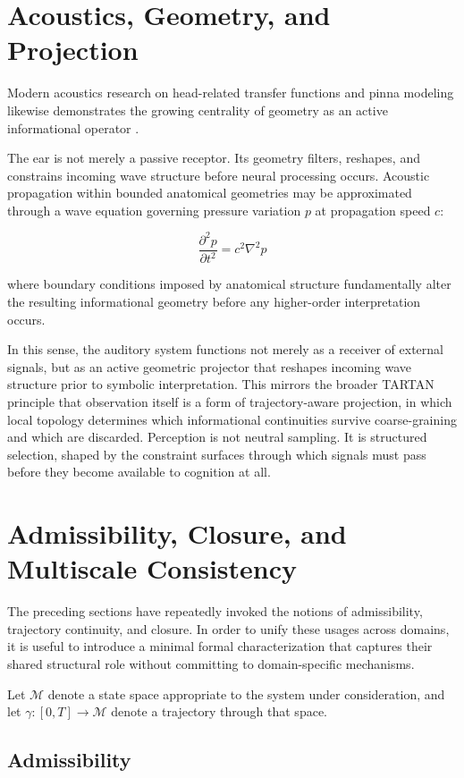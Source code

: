 \documentclass[12pt,a4paper]{article}
\begin{document}
\section{Acoustics, Geometry, and Projection}

Modern acoustics research on head-related transfer functions and pinna modeling
likewise demonstrates the growing centrality of geometry as an active informational
operator \cite{Acoustics}.

The ear is not merely a passive receptor. Its geometry filters, reshapes, and
constrains incoming wave structure before neural processing occurs. Acoustic
propagation within bounded anatomical geometries may be approximated through a wave
equation governing pressure variation $p$ at propagation speed $c$:

\[
\frac{\partial^2 p}{\partial t^2}
=
c^2 \nabla^2 p
\]

where boundary conditions imposed by anatomical structure fundamentally alter the
resulting informational geometry before any higher-order interpretation occurs.

In this sense, the auditory system functions not merely as a receiver of external
signals, but as an active geometric projector that reshapes incoming wave structure
prior to symbolic interpretation. This mirrors the broader TARTAN principle that
observation itself is a form of trajectory-aware projection, in which local topology
determines which informational continuities survive coarse-graining and which are
discarded. Perception is not neutral sampling. It is structured selection, shaped by
the constraint surfaces through which signals must pass before they become available
to cognition at all.

\section{Admissibility, Closure, and Multiscale Consistency}

The preceding sections have repeatedly invoked the notions of admissibility,
trajectory continuity, and closure. In order to unify these usages across domains,
it is useful to introduce a minimal formal characterization that captures their shared
structural role without committing to domain-specific mechanisms.

Let $\mathcal{M}$ denote a state space appropriate to the system under consideration,
and let $\gamma : [0,T] \to \mathcal{M}$ denote a trajectory through that space.

\subsection{Admissibility}
\end{document}
